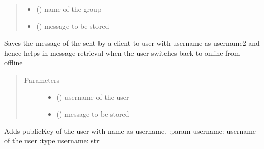 \documentclass[letterpaper,10pt,english]{sphinxmanual}
\begin{document}
\begin{fulllineitems}
\begin{fulllineitems}
\begin{quote}
\begin{description}
\begin{itemize}
\item {} 
 () \textendash{} name of the group

\item {} 
 () \textendash{} message to be stored

\end{itemize}

\end{description}\end{quote}

\end{fulllineitems}


\begin{fulllineitems}
\label{\detokenize{sql:sql.Database.message_sent_to_user}}
Saves the message of the sent by a client to user with username as username2 and hence helps in message retrieval when the user switches back to online from offline
\begin{quote}\begin{description}
\item[{Parameters}] \leavevmode\begin{itemize}
\item {} 
 () \textendash{} username of the user

\item {} 
 () \textendash{} message to be stored

\end{itemize}

\end{description}\end{quote}

\end{fulllineitems}


\begin{fulllineitems}
\label{\detokenize{sql:sql.Database.update_key}}
Adds publicKey of the user with name as username.
:param username: username of the user
:type username: str

\end{fulllineitems}


\end{fulllineitems}
\end{document}
